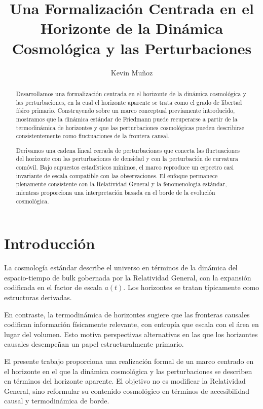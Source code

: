 \documentclass[12pt,a4paper]{article}
\title{Una Formalizaci\'on Centrada en el Horizonte de la Din\'amica Cosmol\'ogica y las Perturbaciones}
\author{Kevin Mu\~noz}
\date{}
\begin{document}
\maketitle

\begin{abstract}
Desarrollamos una formalización centrada en el horizonte de la dinámica cosmológica y las perturbaciones, en la cual el horizonte aparente se trata como el grado de libertad físico primario. Construyendo sobre un marco conceptual previamente introducido, mostramos que la dinámica estándar de Friedmann puede recuperarse a partir de la termodinámica de horizontes y que las perturbaciones cosmológicas pueden describirse consistentemente como fluctuaciones de la frontera causal.

Derivamos una cadena lineal cerrada de perturbaciones que conecta las fluctuaciones del horizonte con las perturbaciones de densidad y con la perturbación de curvatura comóvil. Bajo supuestos estadísticos mínimos, el marco reproduce un espectro casi invariante de escala compatible con las observaciones. El enfoque permanece plenamente consistente con la Relatividad General y la fenomenología estándar, mientras proporciona una interpretación basada en el borde de la evolución cosmológica.
\end{abstract}

\section{Introducción}

La cosmología estándar describe el universo en términos de la dinámica del espacio-tiempo de bulk gobernada por la Relatividad General, con la expansión codificada en el factor de escala $a(t)$. Los horizontes se tratan típicamente como estructuras derivadas.

En contraste, la termodinámica de horizontes sugiere que las fronteras causales codifican información físicamente relevante, con entropía que escala con el área en lugar del volumen. Esto motiva perspectivas alternativas en las que los horizontes causales desempeñan un papel estructuralmente primario.

El presente trabajo proporciona una realización formal de un marco centrado en el horizonte en el que la dinámica cosmológica y las perturbaciones se describen en términos del horizonte aparente. El objetivo no es modificar la Relatividad General, sino reformular su contenido cosmológico en términos de accesibilidad causal y termodinámica de borde.
\end{document}
